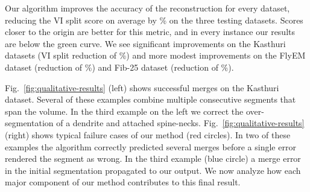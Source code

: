 Our algorithm improves the accuracy of the reconstruction for every dataset, reducing the VI split score on average by \% on the three testing datasets. 
Scores closer to the origin are better for this metric, and in every instance our results are below the green curve.
We see significant improvements on the Kasthuri datasets (VI split reduction of \%) and more modest improvements on the FlyEM dataset (reduction of \%) and Fib-25 dataset (reduction of \%). 

Fig.~\ref{fig:qualitative-results} (left) shows successful merges on the Kasthuri dataset. 
Several of these examples combine multiple consecutive segments that span the volume.
In the third example on the left we correct the over-segmentation of a dendrite and attached spine-necks.
Fig.~\ref{fig:qualitative-results} (right) shows typical failure cases of our method (red circles).
In two of these examples the algorithm correctly predicted several merges before a single error rendered the segment as wrong.
In the third example (blue circle) a merge error in the initial segmentation propagated to our output.
We now analyze how each major component of our method contributes to this final result.

